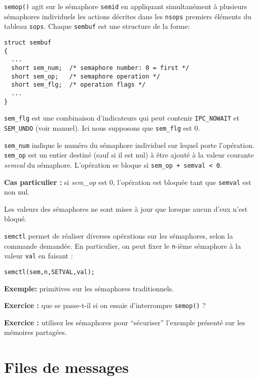 \texttt{semop()} agit sur le sémaphore \texttt{semid} en appliquant
simultanément à plusieurs sémaphores individuels les actions décrites
dans les \texttt{nsops} premiers éléments du tableau
\texttt{sops}. Chaque \texttt{sembuf} est une structure de la forme:


\extrait
\begin{lstlisting}
struct sembuf
{ 
  ...
  short sem_num;  /* semaphore number: 0 = first */
  short sem_op;   /* semaphore operation */
  short sem_flg;  /* operation flags */
  ...
}
\end{lstlisting}

\texttt{sem\_flg} est une combinaison d'indicateurs qui peut contenir
\texttt{IPC\_NOWAIT} et  \texttt{SEM\_UNDO} (voir manuel). Ici nous supposons
que \texttt{sem\_flg} est 0. 


\texttt{sem\_num} indique le numéro du sémaphore individuel sur lequel 
porte l'opération. \texttt{sem\_op} est un entier destiné (sauf si il est nul) 
à être ajouté à la valeur courante \emph{semval} du sémaphore. 
L'opération se bloque si \verb/sem_op + semval < 0/.

 
\textbf{Cas particulier : } si  \emph{sem\_op} est 0, l'opération est bloquée 
tant que  \texttt{semval}
est non nul.


Les valeurs des sémaphores ne sont  mises à jour que lorsque
aucun d'eux n'est bloqué. 


\texttt{semctl} permet de réaliser diverses opérations sur les sémaphores,
selon la commande demandée. En particulier, on peut fixer le
\texttt{n}-ième sémaphore à la valeur \texttt{val} en faisant :

\extrait
\begin{lstlisting}
semctl(sem,n,SETVAL,val);
\end{lstlisting}


\textbf{Exemple: } primitives sur les sémaphores traditionnels.



\source




\textbf{Exercice : } que se passe-t-il si on essaie d'interrompre \texttt{semop()} ?

\textbf{Exercice : } utilisez les sémaphores pour ``sécuriser'' l'exemple
présenté sur les mémoires partagées.
 
\section{Files de messages}

